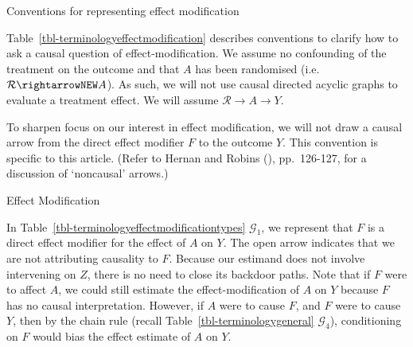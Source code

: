 \documentclass[
  single column]{article}
\begin{document}
\begin{table}

\caption{\label{tbl-terminologyeffectmodification}Conventions for
representing effect modification}

\centering{

\terminologyeffectmodification

}

\end{table}%

Table~\ref{tbl-terminologyeffectmodification} describes conventions to
clarify how to ask a causal question of effect-modification. We assume
no confounding of the treatment on the outcome and that \(A\) has been
randomised (i.e.~\(\mathcal{R} \rightarrowNEW A\)). As such, we will not
use causal directed acyclic graphs to evaluate a treatment effect. We
will assume \(\mathcal{R}  \to A \to Y\).

To sharpen focus on our interest in effect modification, we will not
draw a causal arrow from the direct effect modifier \(F\) to the outcome
\(Y\). This convention is specific to this article. (Refer to Hernan and
Robins (), pp.~126-127, for a
discussion of `noncausal' arrows.)

\begin{table}

\caption{\label{tbl-terminologyeffectmodificationtypes}Effect
Modification}

\centering{

\terminologyeffectmodificationtypes

}

\end{table}%

In Table~\ref{tbl-terminologyeffectmodificationtypes} \(\mathcal{G}_1\),
we represent that \(F\) is a direct effect modifier for the effect of
\(A\) on \(Y\). The open arrow indicates that we are not attributing
causality to \(F\). Because our estimand does not involve intervening on
\(Z\), there is no need to close its backdoor paths. Note that if \(F\)
were to affect \(A\), we could still estimate the effect-modification of
\(A\) on \(Y\) because \(F\) has no causal interpretation. However, if
\(A\) were to cause \(F\), and \(F\) were to cause \(Y\), then by the
chain rule (recall Table~\ref{tbl-terminologygeneral}
\(\mathcal{G}_4\)), conditioning on \(F\) would bias the effect estimate
of \(A\) on \(Y\).
\end{document}
